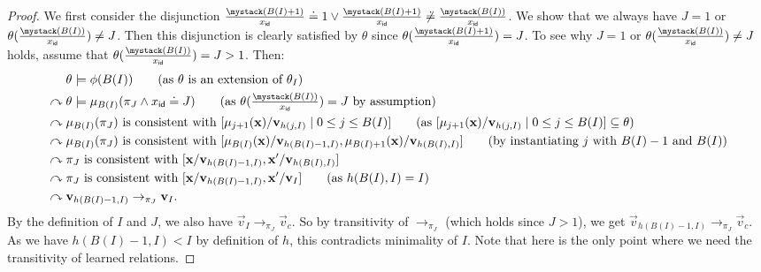 {\begin{proof}
    We first consider the disjunction $\ind[\id]{x}{B(I)+1} \doteq 1 \lor \ind[\id]{x}{B(I)+1} \not\doteq \ind[\id]{x}{B(I)}$.
    We show that we always have $J=1$ or $\theta(\ind[\id]{x}{B(I)}) \neq J$.
    Then this disjunction is clearly satisfied by $\theta$ since $\theta(\ind[\id]{x}{B(I)+1}) = J$.
    To see why $J=1$ or $\theta(\ind[\id]{x}{B(I)}) \neq J$ holds, assume that $\theta(\ind[\id]{x}{B(I)}) = J > 1$.
    Then:
    \begin{align*}
                             & \theta \models \phi(B(I)) \tag {as $\theta$ is an extension of $\theta_I$} \\
      {} \curvearrowright {} & \theta \models \mu_{B(I)}(\pi_J \land x_{\id} \doteq J) \tag{as $\theta(\ind[\id]{x}{B(I)}) = J$ by assumption}                                                                                 \\
      {} \curvearrowright {} & \mu_{B(I)}(\pi_J) \text{ is consistent with } [\mu_{j+1}(\vec{x})/\vec{v}_{h(j,I)} \mid 0 \leq j \leq B(I)] \tag{as $[\mu_{j+1}(\vec{x})/\vec{v}_{h(j,I)} \mid 0 \leq j \leq B(I)] \subseteq \theta$} \\
      {} \curvearrowright {} & \mu_{B(I)}(\pi_J) \text{ is consistent with } [\mu_{B(I)}(\vec{x})/\vec{v}_{h(B(I)-1,I)},\mu_{B(I)+1}(\vec{x})/\vec{v}_{h(B(I),I)}] \tag{by instantiating $j$ with $B(I)-1$ and $B(I)$}           \\
      {} \curvearrowright {} & \pi_J \text{ is consistent with } [\vec{x}/\vec{v}_{h(B(I)-1,I)},\vec{x}'/\vec{v}_{h(B(I),I)}]                                                                                                      \\
      {} \curvearrowright {} & \pi_J \text{ is consistent with } [\vec{x}/\vec{v}_{h(B(I)-1,I)},\vec{x}'/\vec{v}_{I}] \tag{as $h(B(I),I) = I$}                                                                                     \\
      {} \curvearrowright {} & \vec{v}_{h(B(I)-1,I)} \to_{\pi_J} \vec{v}_{I}.
    \end{align*}
    By the definition of $I$ and $J$, we also have $\vec{v}_{I} \to_{\pi_J} \vec{v}_{c}$.
    So by transitivity of $\to_{\pi_J}$ (which holds since $J > 1$), we get $\vec{v}_{h(B(I)-1,I)} \to_{\pi_J} \vec{v}_{c}$.
    As we have $h(B(I)-1,I) < I$ by definition of $h$, this contradicts minimality of $I$.
    Note that here is the only point where we need the transitivity of learned relations.


\end{proof}}
